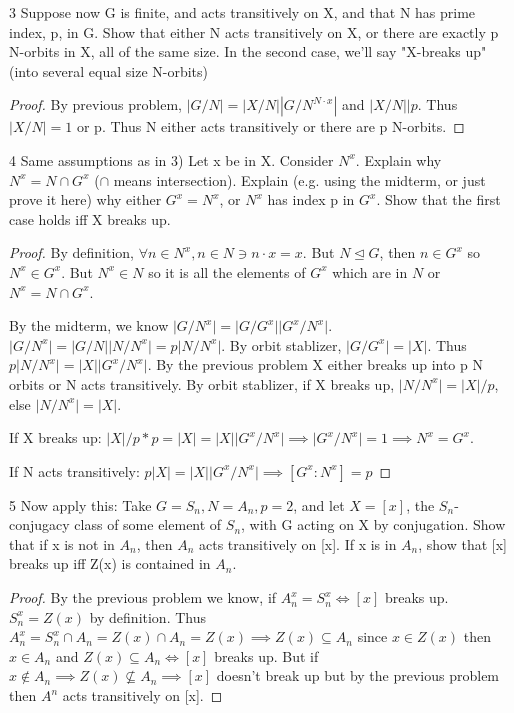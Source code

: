 \documentclass{article}
\newcommand{\abs}[1]{\lvert #1\rvert}
\begin{document}
\bigskip

\begin{PROB}{3}\label{Problem 3.}
    Suppose now G is finite, and acts transitively on X, and that N has prime index, p, in G. Show that either N acts transitively on X, or there are exactly p  N-orbits in X, all of the same size. In the second case, we'll say "X-breaks up" (into several equal size N-orbits)
\end{PROB}
\begin{proof}
    By previous problem, $|G/N| = |X/N||G/N^{N\cdot x}|$ and $|X/N| | p$. Thus $|X/N| = 1$ or p. Thus N either acts transitively or there are p N-orbits.
\end{proof}

\bigskip

\begin{PROB}{4}\label{Problem 4.}
    Same assumptions as in 3) Let x be in X.  Consider $N^x$.  Explain why $N^x = N \cap G^x$ ($\cap$ means intersection). Explain (e.g. using the midterm, or just prove it here) why either $G^x = N^x$, or $N^x$ has index p in $G^x$. Show that the first case holds iff X breaks up.
\end{PROB}
\begin{proof}
    By definition, $\forall n \in N^x, n \in N \ni n \cdot x = x$. But $N \trianglelefteq G$, then $n \in G^x$ so $N^x \in G^x$. But $N^x \in N$ so it is all the elements of $G^x$ which are in $N$ or $N^x = N \cap G^x$. 
    
    By the midterm, we know $\abs{G/N^x} = \abs{G/G^x}\abs{G^x/N^x}$. $\abs{G/N^x} = \abs{G/N}\abs{N/N^x} = p \abs{N/N^x}$. By orbit stablizer, $\abs{G/G^x}= |X|$. Thus $p \abs{N/N^x} = |X|\abs{G^x/N^x}$. By the previous problem X either breaks up into p N orbits or N acts transitively. By orbit stablizer, if X breaks up, $\abs{N/N^x} = |X|/p$, else $\abs{N/N^x} = |X|$. 

    If X breaks up: $|X|/p * p = |X| = |X|\abs{G^x/N^x} \implies \abs{G^x/N^x} = 1 \implies N^x = G^x$.

    If N acts transitively: $p|X| = |X|\abs{G^x/N^x} \implies [G^x : N^x] = p$
\end{proof}

\bigskip

\begin{PROB}{5}\label{Problem 5.}
    Now apply this: Take $G = S_n, N = A_n, p=2$, and let $X = [x]$, the $S_n$-conjugacy class of some element of $S_n$, with G acting on X by conjugation. Show that if x is not in $A_n$, then $A_n$ acts transitively on [x]. If x is in $A_n$, show that [x] breaks up iff Z(x) is contained in $A_n$.  
\end{PROB}
\begin{proof}
    By the previous problem we know, if $A_n^x = S_n^x \iff [x]$ breaks up. $S_n^x = Z(x)$ by definition. Thus $A_n^x = S_n^x \cap A_n = Z(x) \cap A_n = Z(x) \implies Z(x) \subseteq A_n$ since $x \in Z(x)$ then $x \in A_n$ and $Z(x) \subseteq A_n \iff [x]$ breaks up. But if $x \not \in A_n \implies Z(x) \not \subseteq A_n \implies [x]$ doesn't break up but by the previous problem then $A^n$ acts transitively on [x].
\end{proof}
\end{document}
